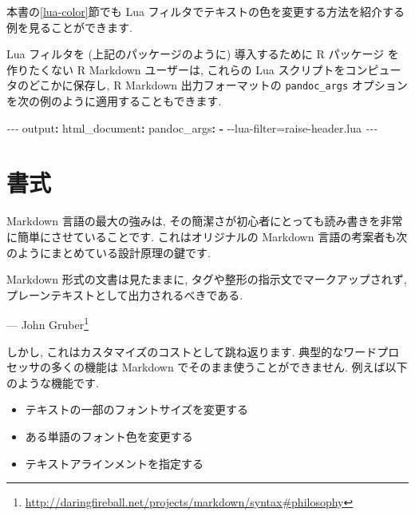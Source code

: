 \documentclass[
  11pt,
  lualatex,
  ja=standard]{bxjsreport}
\newenvironment{Shaded}{\begin{snugshade}}{\end{snugshade}}
\newcommand{\AttributeTok}[1]{\textcolor[rgb]{0.77,0.63,0.00}{#1}}
\newcommand{\FunctionTok}[1]{\textcolor[rgb]{0.00,0.00,0.00}{#1}}
\newcommand{\KeywordTok}[1]{\textcolor[rgb]{0.13,0.29,0.53}{\textbf{#1}}}
\newcommand{\PreprocessorTok}[1]{\textcolor[rgb]{0.56,0.35,0.01}{\textit{#1}}}
\renewenvironment{quote}{\def\FrameCommand{{\color{quotebarcolor}{\vrule width 3pt}}\hspace{10pt}}\MakeFramed{\advance\hsize-\width\FrameRestore}}{\endMakeFramed}
\renewcommand{\href}[2]{#2\footnote{\url{#1}}}
\begin{document}
本書の\ref{lua-color}節でも Lua フィルタでテキストの色を変更する方法を紹介する例を見ることができます.

Lua フィルタを (上記のパッケージのように) 導入するために R パッケージ を作りたくない R Markdown ユーザーは, これらの Lua スクリプトをコンピュータのどこかに保存し, R Markdown 出力フォーマットの \texttt{pandoc\_args} オプションを次の例のように適用することもできます.

\begin{Shaded}
\begin{Highlighting}[]
\PreprocessorTok{{-}{-}{-}}
\FunctionTok{output}\KeywordTok{:}
\AttributeTok{  }\FunctionTok{html\_document}\KeywordTok{:}
\AttributeTok{    }\FunctionTok{pandoc\_args}\KeywordTok{:}
\AttributeTok{      }\KeywordTok{{-}}\AttributeTok{ {-}{-}lua{-}filter=raise{-}header.lua}
\PreprocessorTok{{-}{-}{-}}
\end{Highlighting}
\end{Shaded}

\hypertarget{formatting}{%
\chapter{書式}\label{formatting}}

Markdown 言語の最大の強みは, その簡潔さが初心者にとっても読み書きを非常に簡単にさせていることです. これはオリジナルの Markdown 言語の考案者も次のようにまとめている設計原理の鍵です.

\begin{quote}
Markdown 形式の文書は見たままに, タグや整形の指示文でマークアップされず, プレーンテキストとして出力されるべきである.

\begin{flushright}
--- \href{http://daringfireball.net/projects/markdown/syntax\#philosophy}{John Gruber}

\end{flushright}
\end{quote}

しかし, これはカスタマイズのコストとして跳ね返ります. 典型的なワードプロセッサの多くの機能は Markdown でそのまま使うことができません. 例えば以下のような機能です.

\begin{itemize}
\item
  テキストの一部のフォントサイズを変更する
\item
  ある単語のフォント色を変更する
\item
  テキストアラインメントを指定する
\end{itemize}
\end{document}
